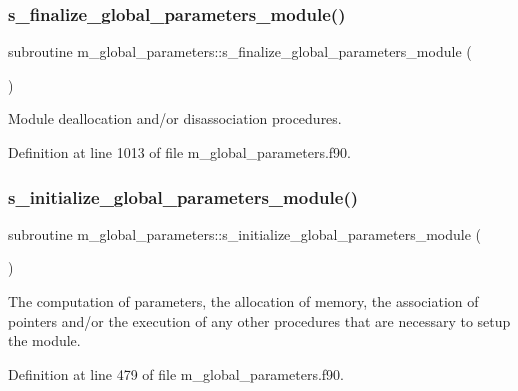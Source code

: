 \subsubsection{\texorpdfstring{s\+\_\+finalize\+\_\+global\+\_\+parameters\+\_\+module()}{s\_finalize\_global\_parameters\_module()}}
{\footnotesize\ttfamily subroutine m\+\_\+global\+\_\+parameters\+::s\+\_\+finalize\+\_\+global\+\_\+parameters\+\_\+module (\begin{DoxyParamCaption}{ }\end{DoxyParamCaption})}



Module deallocation and/or disassociation procedures. 



Definition at line 1013 of file m\+\_\+global\+\_\+parameters.\+f90.

\mbox{\label{namespacem__global__parameters_a8a76198d180cb9736c21dde108cb0dbf}} 
\subsubsection{\texorpdfstring{s\+\_\+initialize\+\_\+global\+\_\+parameters\+\_\+module()}{s\_initialize\_global\_parameters\_module()}}
{\footnotesize\ttfamily subroutine m\+\_\+global\+\_\+parameters\+::s\+\_\+initialize\+\_\+global\+\_\+parameters\+\_\+module (\begin{DoxyParamCaption}{ }\end{DoxyParamCaption})}



The computation of parameters, the allocation of memory, the association of pointers and/or the execution of any other procedures that are necessary to setup the module. 



Definition at line 479 of file m\+\_\+global\+\_\+parameters.\+f90.

\mbox{\label{namespacem__global__parameters_a1611e2cf82243c04b04a11281ef67993}} 
